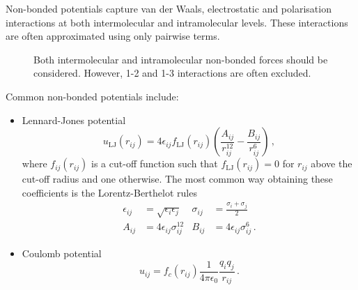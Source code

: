\documentclass{article}
\theoremstyle{plain}\theoremheaderfont{\normalfont\itshape}\theorembodyfont{\rmfamily}\theoremseparator{.}\newtheorem*{rem}{Remark}\newtheorem*{ex}{Example}\newtheorem*{proof}{Proof}\newtheorem*{altp}{Alternative proof}
\theoremstyle{plain}\theoremheaderfont{\normalfont\bfseries}\theorembodyfont{\rmfamily}\theoremseparator{.}\newtheorem{thm}{Theorem}[section]\newtheorem{lem}[thm]{Lemma}\newtheorem{prop}[thm]{Proposition}\newtheorem*{cor}{Corollary}\newtheorem{defn}[thm]{Definition}\newtheorem{clm}[thm]{Claim}\newtheorem{clminproof}{Claim}\newtheorem{alg}[thm]{Algorithm}\newtheorem{hyp}[thm]{Hypothesis}\newtheorem{law}[thm]{Law}
\theoremstyle{break}\theoremheaderfont{\normalfont\itshape}\theorembodyfont{\rmfamily}\theoremseparator{.\medskip}\newtheorem*{proofskip}{Proof}\newtheorem*{exs}{Examples}\newtheorem*{rems}{Remarks}
\theoremstyle{break}\theoremheaderfont{\normalfont\bfseries}\theorembodyfont{\rmfamily}\theoremseparator{.\medskip}\newtheorem{lemskip}[thm]{Lemma}\newtheorem{defnskip}[thm]{Definition}\newtheorem{propskip}[thm]{Proposition}\newtheorem{thmskip}[thm]{Theorem}
\numberwithin{equation}{section}
\begin{document}
    Non-bonded potentials capture van der Waals, electrostatic and polarisation interactions at both intermolecular and intramolecular levels. These interactions are often approximated using only pairwise terms.
    \begin{figure}[ht!]
        \centering
        \caption{Both intermolecular and intramolecular non-bonded forces should be considered. However, 1-2 and 1-3 interactions are often excluded.}
    \end{figure}

    Common non-bonded potentials include:
    \begin{itemize}[topsep=0pt]
        \item Lennard-Jones potential
        \begin{equation}
            u_{\text{LJ}}(r_{ij})=4\epsilon_{ij}f_{\text{LJ}}(r_{ij})\left(\frac{A_{ij}}{r_{ij}^{12}}-\frac{B_{ij}}{r_{ij}^6}\right)\,,
        \end{equation}
        where \(f_{ij}(r_{ij})\) is a cut-off function such that \(f_{\text{LJ}}(r_{ij})=0\) for \(r_{ij}\) above the cut-off radius and one otherwise. The most common way obtaining these coefficients is the Lorentz-Berthelot rules
        \begin{align}
            \epsilon_{ij}&=\sqrt{\epsilon_i\epsilon_j} & \sigma_{ij}&=\frac{\sigma_i+\sigma_j}{2} \\
            A_{ij}&=4\epsilon_{ij}\sigma_{ij}^{12} & B_{ij}&=4\epsilon_{ij}\sigma_{ij}^6\,.
        \end{align}
        \item Coulomb potential
        \begin{equation}
            u_{ij}=f_c(r_{ij})\frac{1}{4\pi\epsilon_0}\frac{q_iq_j}{r_{ij}}\,.
        \end{equation}
    \end{itemize}
\end{document}
